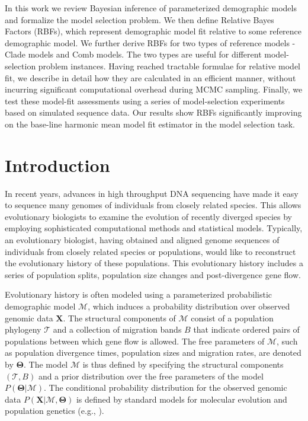 \documentclass[11pt]{article}
\newcommand{\vect}[1]{\boldsymbol{\mathbf{#1}}}
\newcommand{\X}{\vect{X}}
\newcommand{\M}{\mathcal{M}}
\newcommand{\Tr}{\mathcal{T}}
\newcommand{\T}{\vect{\Theta}}
\newcommand{\1}{\mathbbm{1}}
\begin{document}
In this work we review Bayesian inference of parameterized demographic models and formalize the model selection problem.
%
We then define Relative Bayes Factors (RBFs), which represent demographic model fit relative to some reference demographic model.
%
We further derive RBFs for two types of reference models - Clade models and Comb models. The two types are useful for different model-selection problem instances.
%
Having reached tractable formulae for relative model fit, we describe in detail how they are calculated in an efficient manner, without incurring significant computational overhead during MCMC sampling. 
%
Finally, we test these model-fit assessments using a series of model-selection experiments based on simulated sequence data.
%
Our results show RBFs significantly improving on the base-line harmonic mean model fit estimator in the model selection task.


\newpage

\tableofcontents

\newpage








\section{Introduction}

In recent years, advances in high throughput DNA sequencing have made it easy to sequence many genomes of individuals from closely related species. This allows evolutionary biologists to examine the evolution of recently diverged species by employing sophisticated computational methods and statistical models.
%
Typically, an evolutionary biologist, having obtained and aligned genome sequences of individuals from closely related species or populations, would like to reconstruct the evolutionary history of these populations. This evolutionary history includes a series of population splits, population size changes and post-divergence gene flow.


Evolutionary history is often modeled using a parameterized probabilistic demographic model $\M$, which induces a probability distribution over observed genomic data $\X$.
%
The structural components of $\M$ consist of a population phylogeny $\Tr$ and a collection
of migration bands $B$ that indicate ordered pairs of populations between which gene flow is allowed.
%
The free parameters of $\M$, such as population divergence times, population sizes and migration rates, are denoted by $\T$.
%
The model $\M$ is thus defined by specifying the structural components $(\Tr,B)$ and a prior distribution over the free parameters of the model $P(\T|\M)$.
%
The conditional probability distribution for the observed genomic data $P(\X|\M,\T)$ is defined by standard models for molecular evolution and population genetics (e.g., \cite{JUKECANT69,KING82A}).
\end{document}
